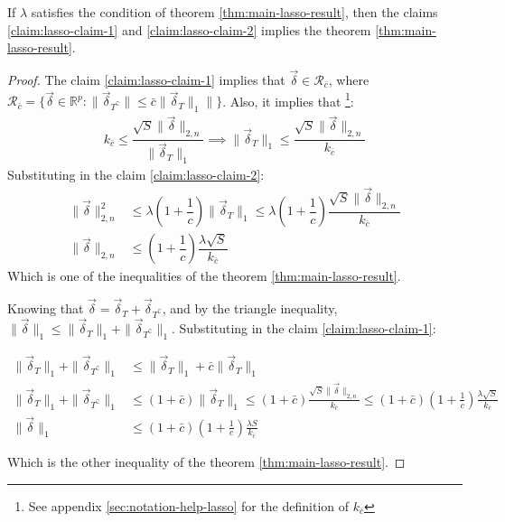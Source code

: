 \begin{claim}
If $\lambda$ satisfies the condition of theorem \ref{thm:main-lasso-result}, then the claims \ref{claim:lasso-claim-1} and \ref{claim:lasso-claim-2} implies the theorem \ref{thm:main-lasso-result}.
\end{claim}
\begin{proof}[Proof]
    The claim \ref{claim:lasso-claim-1} implies that $\Vec{\delta} \in \mathcal{R}_{\bar{c}}$, where $\mathcal{R}_{\bar{c}} = \{\Vec{\delta} \in \mathbb{R}^p: \|\Vec{\delta}_{T^\complement}\| \leq \bar{c} \|\Vec{\delta}_T\|_1\|\}$. Also, it implies that \footnote{See appendix \ref{sec:notation-help-lasso} for the definition of $k_{\bar{c}}$}:
    \begin{align*}
        k_{\bar{c}} 
        \leq
        \dfrac{\sqrt{S} \|\Vec{\delta}\|_{2,n}}{\|\Vec{\delta}_T\|_1}
        \implies
        \|\Vec{\delta}_T\|_1
        \leq
        \dfrac{\sqrt{S} \|\Vec{\delta}\|_{2,n}}{k_{\bar{c}}}
    \end{align*}
    Substituting in the claim \ref{claim:lasso-claim-2}:
    \begin{align*}
        \|\Vec{\delta}\|_{2, n}^{2}
        &\leq
        \lambda \left(
            1 + \dfrac{1}{c}
        \right) \|\Vec{\delta}_T\|_{1}
        \leq
        \lambda \left(
            1 + \dfrac{1}{c}
        \right) \dfrac{\sqrt{S} \|\Vec{\delta}\|_{2,n}}{k_{\bar{c}}}\\
        \|\Vec{\delta}\|_{2, n}
        &\leq
        \left(1 + \dfrac{1}{c}\right)
        \dfrac{\lambda \sqrt{S}}{k_{\bar{c}}}
    \end{align*}
    Which is one of the inequalities of the theorem \ref{thm:main-lasso-result}. 

    Knowing that $\Vec{\delta} = \Vec{\delta}_T + \Vec{\delta}_{T^\complement}$, and by the triangle inequality, $\|\Vec{\delta}\|_1 \leq \|\Vec{\delta}_T\|_1 + \|\Vec{\delta}_{T^\complement}\|_1$. Substituting in the claim \ref{claim:lasso-claim-1}:

    \begin{align*}
        \|\Vec{\delta}_T\|_1 + \|\Vec{\delta}_{T^\complement}\|_1
        &\leq
        \|\Vec{\delta}_T\|_1 + \bar{c} \|\Vec{\delta}_T\|_1\\
        \|\Vec{\delta}_T\|_1 + \|\Vec{\delta}_{T^\complement}\|_1
        &\leq
        (1 + \bar{c}) \|\Vec{\delta}_T\|_1
        \leq 
        (1 + \bar{c}) \frac{\sqrt{S} \|\Vec{\delta}\|_{2, n}}{k_{\bar{c}}}
        \leq 
        (1 + \bar{c}) (1 + \frac{1}{c}) \frac{\lambda \sqrt{S}}{k_{\bar{c}}}\\
        \|\Vec{\delta}\|_1
        &\leq 
        (1 + \bar{c}) (1 + \frac{1}{c}) \frac{\lambda S}{k_{\bar{c}}}
    \end{align*}

    Which is the other inequality of the theorem \ref{thm:main-lasso-result}.
\end{proof}